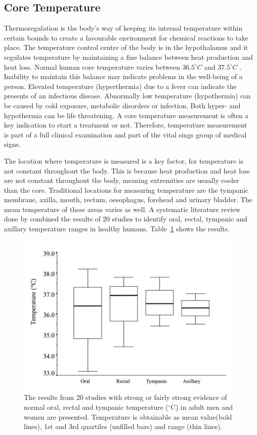 \subsection{Core Temperature}
Thermoregulation is the body's way of keeping its internal temperature within certain bounds to create a favourable environment for chemical reactions to take place. The temperature control centre of the body is in the hypothalamus and it regulates temperature by maintaining a fine balance between heat production and heat loss. Normal human core temperature varies between $36.5^{\circ}C$ and $37.5^{\circ}C$ \citep{jones2010biomedical}. Inability to maintain this balance may indicate problems in the well-being of a person. Elevated temperature (hyperthermia) due to a fever can indicate the presents of an infectious disease. Abnormally low temperature (hypothermia) can be caused by cold exposure, metabolic disorders or infection. Both hyper- and hypothermia can be life threatening. A core temperature measurement is often a key indication to start a treatment or not. Therefore, temperature measurement is part of a full clinical examination and part of the vital sings group of medical signs.

\medskip
The location where temperature is measured is a key factor, for temperature is not constant throughout the body. This is because heat production and heat loss are not constant throughout the body, meaning extremities are usually cooler than the core. Traditional locations for measuring temperature are the tympanic membrane, axilla, mouth, rectum, oesophagus, forehead and urinary bladder. The mean temperature of these areas varies as well. A systematic literature review done by \cite{sund2002normal} combined the results of 20 studies to identify oral, rectal, tympanic and axillary temperature ranges in healthy humans. Table~\ref{fig:VariationsInTemp} shows the results.

 \begin{figure}
   \centering
   \includegraphics[scale=0.3]{figs/VariationsInTemp}
   \caption{The results from 20 studies with strong or fairly strong evidence of normal oral, rectal and tympanic temperature ($^{\circ}$C) in adult men and women are presented. Temperature is obtainable as mean value(bold lines), 1st and 3rd quartiles (unfilled bars) and range (thin lines).}
   \label{fig:VariationsInTemp}
\end{figure}

